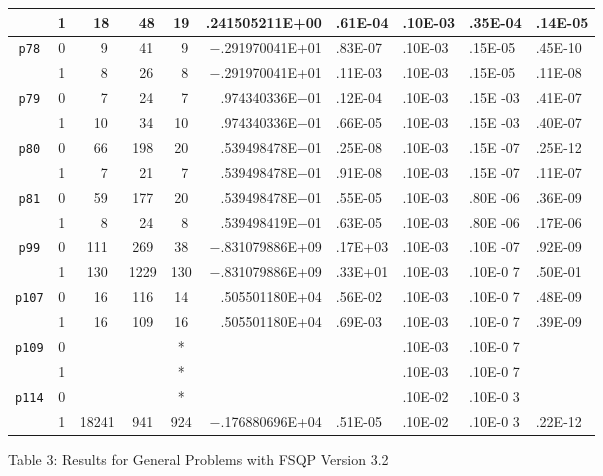 {\begin{tabular}{cccccrllll}
           &1 &~18   & ~48   &19  &   .241505211E+00 &.61E-04 &.10E-03 &.35E-04
&.14E-05\\\hline
 {\tt p78} &0 &~~9   & ~41   &~9  &$-$.291970041E+01 &.83E-07 &.10E-03 &.15E-05
&.45E-10\\
           &1 &~~8   & ~26   &~8  &$-$.291970041E+01 &.11E-03 &.10E-03 &.15E-05
&.11E-08\\\hline
 {\tt p79} &0 &~~7   & ~24   &~7  &   .974340336E$-$01 &.12E-04 & .10E-03 &.15E
-03&.41E-07\\
           &1 &~10   & ~34   &10  &   .974340336E$-$01 &.66E-05 & .10E-03 &.15E
-03&.40E-07\\\hline
 {\tt p80} &0 & ~66  &  198  & 20 &   .539498478E$-$01 &.25E-08 & .10E-03 &.15E
-07&.25E-12\\
           &1 & ~~7  &  ~21  & ~7 &   .539498478E$-$01 &.91E-08 & .10E-03 &.15E
-07&.11E-07\\\hline
 {\tt p81} &0 & ~59  &   177 & 20 &   .539498478E$-$01 &.55E-05 & .10E-03 &.80E
-06&.36E-09\\
           &1 & ~~8  &   ~24 & ~8 &   .539498419E$-$01 &.63E-05 & .10E-03 &.80E
-06&.17E-06\\\hline
 {\tt p99} & 0& 111  &  269  & 38 &$-$.831079886E+09   &.17E+03 & .10E-03 &.10E
-07&.92E-09  \\
           & 1& 130  & 1229  &130 &$-$.831079886E+09 &.33E+01 & .10E-03 &.10E-0
7&.50E-01  \\\hline
 {\tt p107}&0 & ~16  &  116  & 14 &   .505501180E+04 & .56E-02& .10E-03 &.10E-0
7&.48E-09  \\
           &1 & ~16  &  109  & 16 &   .505501180E+04 &.69E-03 & .10E-03 &.10E-0
7&.39E-09\\\hline
 {\tt p109}&0 &      &       &  * &                  &        & .10E-03 &.10E-0
7&  \\
           &1 &      &       &  * &                  &        & .10E-03 &.10E-0
7&  \\\hline
 {\tt p114}&0 &      &       & *  &                  &        & .10E-02 &.10E-0
3&  \\ 
           &1 &18241 &  941  &924 &$-$.176880696E+04 &.51E-05 & .10E-02 &.10E-0
3&.22E-12  \\\hline
\end{tabular}
}

\nopagebreak
\vspace{0.4em}
\hspace{8em}Table 3: Results for General Problems with FSQP Version 3.2


